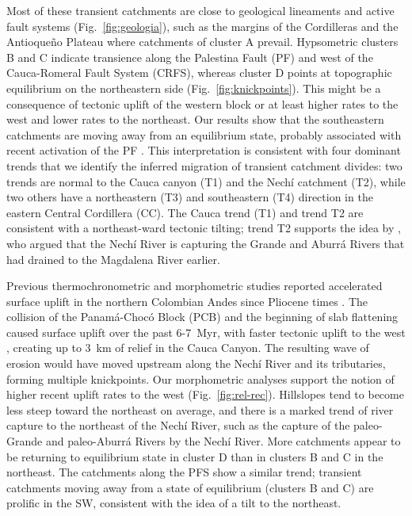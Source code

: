 \documentclass[draft]{agujournal2019}
\begin{document}
\par Most of these transient catchments are close to geological lineaments and active fault systems (Fig.~\ref{fig:geologia}), such as the margins of the Cordilleras and the Antioqueño Plateau where catchments of cluster A prevail. Hypsometric clusters B and C indicate transience along the Palestina Fault (PF) and west of the Cauca-Romeral Fault System (CRFS), whereas cluster D points at topographic equilibrium on the northeastern side (Fig.~\ref{fig:knickpoints}). This might be a consequence of tectonic uplift of the western block or at least higher rates to the west \cite{perez2021} and lower rates to the northeast. Our results show that the southeastern catchments are moving away from an equilibrium state, probably associated with recent activation of the PF \cite{acosta2007, feininger1970}. This interpretation is consistent with four dominant trends that we identify the inferred migration of transient catchment divides: two trends are normal to the Cauca canyon (T1) and the Nechí catchment (T2), while two others have a northeastern (T3) and southeastern (T4) direction in the eastern Central Cordillera (CC). The Cauca trend (T1) and trend T2 are consistent with a northeast-ward tectonic tilting; trend T2 supports the idea by , who argued that the Nechí River is capturing the Grande and Aburrá Rivers that had drained to the Magdalena River earlier. 

\par Previous thermochronometric and morphometric studies reported accelerated surface uplift in the northern Colombian Andes since Pliocene times \cite{restrepo2019, Noriega2020, perez2021, perez2022, ott2023}. The collision of the Panamá-Chocó Block (PCB) and the beginning of slab flattening caused surface uplift over the past 6-7~Myr, with faster tectonic uplift to the west \cite{perez2021, ott2023}, creating up to 3~km of relief in the Cauca Canyon. The resulting wave of erosion would have moved upstream along the Nechí River and its tributaries, forming multiple knickpoints. Our morphometric analyses support the notion of higher recent uplift rates to the west (Fig.~\ref{fig:rel-rec}). %
Hillslopes tend to become less steep toward the northeast on average, and there is a marked trend of river capture to the northeast of the Nechí River, such as the capture of the paleo-Grande and paleo-Aburrá Rivers by the Nechí River. More catchments appear to be returning to equilibrium state in cluster D than in clusters B and C in the northeast. The catchments along the PFS show a similar trend; transient catchments moving away from a state of equilibrium (clusters B and C) are prolific in the SW, consistent with the idea of a tilt to the northeast.
\end{document}
